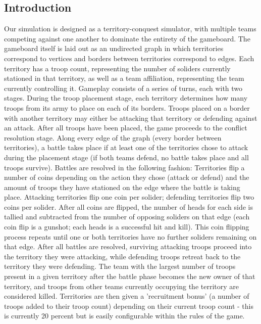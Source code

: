 \documentclass[10pt]{article}
\begin{document}
	\begin{multicols}{2}
		\section*{Introduction}
		
		Our simulation is designed as a territory-conquest simulator, with multiple teams competing against one another to dominate the entirety of the gameboard. 
		The gameboard itself is laid out as an undirected graph in which territories correspond to vertices and borders between territories correspond to edges.
		Each territory has a troop count, representing the number of soliders currently stationed in that territory, as well as a team affiliation, representing the team currently controlling it.
		Gameplay consists of a series of turns, each with two stages. 
		During the troop placement stage, each territory determines how many troops from its army to place on each of its borders.
		Troops placed on a border with another territory may either be attacking that territory or defending against an attack.
		After all troops have been placed, the game proceeds to the conflict resolution stage.
		Along every edge of the graph (every border between territories), a battle takes place if at least one of the territories chose to attack during the placement stage (if both teams defend, no battle takes place and all troops survive).
		Battles are resolved in the following fashion: 
		Territories flip a number of coins depending on the action they chose (attack or defend) and the amount of troops they have stationed on the edge where the battle is taking place. 
		Attacking territories flip one coin per solider; defending territories flip two coins per solider.
		After all coins are flipped, the number of heads for each side is tallied and subtracted from the number of opposing soliders on that edge (each coin flip is a gunshot; each heads is a successful hit and kill).
		This coin flipping process repeats until one or both territories have no further soliders remaining on that edge. 
		After all battles are resolved, surviving attacking troops proceed into the territory they were attacking, while defending troops retreat back to the territory they were defending. 
		The team with the largest number of troops present in a given territory after the battle phase becomes the new owner of that territory, and troops from other teams currently occupying the territory are considered killed.
		Territories are then given a 'recruitment bonus' (a number of troops added to their troop count) depending on their current troop count - this is currently 20 percent but is easily configurable within the rules of the game.

\end{multicols}
\end{document}
